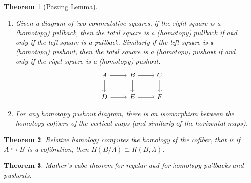 \documentclass{scrartcl}
\theoremstyle{plain}
\newtheorem{theorem}{Theorem}[section]
\theoremstyle{definition}
\newcommand{\iso}{\cong}
\newcommand{\injto}{\hookrightarrow}
\begin{document}
\begin{theorem}[Pasting Lemma]
    \begin{enumerate}
    \item Given a diagram of two commutative squares, if the right square is a (homotopy) pullback, then the total square is a (homotopy) pullback if and only if the left square is a pullback. Similarly if the left square is a (homotopy) pushout, then the total square is a (homotopy) pushout if and only if the right square is a (homotopy) pushout.
\begin{equation}
    \begin{tikzcd}
        A \dar\rar & B \dar\rar &\dar C \\
        D \rar & E \rar & F
    \end{tikzcd}
\end{equation}
    \item For any homotopy pushout diagram, there is an isomorphism between the homotopy cofibers of the vertical maps (and similarly of the horizontal maps).
\end{enumerate}
\end{theorem}

\begin{theorem}
    Relative homology computes the homology of the cofiber, that is if $A\injto B$ is a cofibration, then $H(B/A) \iso H(B, A)$.
\end{theorem}

\begin{theorem}
    Mather's cube theorem for regular and for homotopy pullbacks and pushouts. 
\end{theorem}



\end{document}
